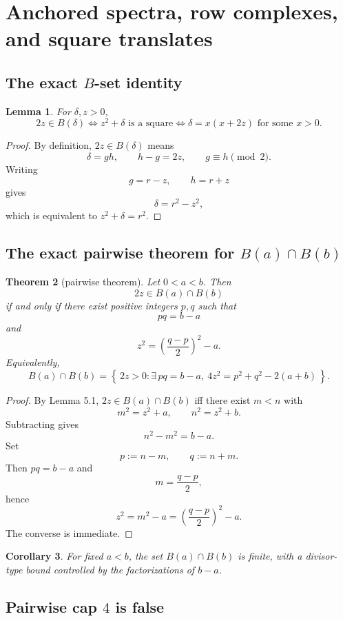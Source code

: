 \documentclass[11pt]{article}
\theoremstyle{plainbreak}
\newtheorem{theorem}{Theorem}[section]
\newtheorem{lemma}[theorem]{Lemma}
\newtheorem{corollary}[theorem]{Corollary}
\theoremstyle{defbreak}
\newcommand{\Bset}{B}
\begin{document}
\section{Anchored spectra, row complexes, and square translates}

\subsection{The exact $B$-set identity}

\begin{lemma}
For $\delta,z>0$,
\[
2z\in \Bset(\delta)
\iff
z^2+\delta \text{ is a square}
\iff
\delta=x(x+2z)\text{ for some }x>0.
\]
\end{lemma}

\begin{proof}
By definition, $2z\in \Bset(\delta)$ means
\[
\delta=gh,\qquad h-g=2z,\qquad g\equiv h\pmod 2.
\]
Writing
\[
g=r-z,\qquad h=r+z
\]
gives
\[
\delta=r^2-z^2,
\]
which is equivalent to $z^2+\delta=r^2$.
\end{proof}

\subsection{The exact pairwise theorem for $B(a)\cap B(b)$}

\begin{theorem}[pairwise theorem]
Let $0<a<b$. Then
\[
2z\in \Bset(a)\cap \Bset(b)
\]
if and only if there exist positive integers $p,q$ such that
\[
pq=b-a
\]
and
\[
z^2=\left(\frac{q-p}{2}\right)^2-a.
\]
Equivalently,
\[
\Bset(a)\cap \Bset(b)=
\left\{\,2z>0:\exists\,pq=b-a,\ 4z^2=p^2+q^2-2(a+b)\,\right\}.
\]
\end{theorem}

\begin{proof}
By Lemma 5.1, $2z\in \Bset(a)\cap \Bset(b)$ iff there exist $m<n$ with
\[
m^2=z^2+a,\qquad n^2=z^2+b.
\]
Subtracting gives
\[
n^2-m^2=b-a.
\]
Set
\[
p:=n-m,\qquad q:=n+m.
\]
Then $pq=b-a$ and
\[
m=\frac{q-p}{2},
\]
hence
\[
z^2=m^2-a=\left(\frac{q-p}{2}\right)^2-a.
\]
The converse is immediate.
\end{proof}

\begin{corollary}
For fixed $a<b$, the set $\Bset(a)\cap \Bset(b)$ is finite, with a divisor-type bound controlled by the factorizations of $b-a$.
\end{corollary}

\subsection{Pairwise cap $4$ is false}
\end{document}
